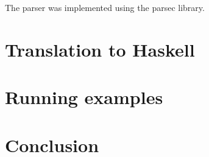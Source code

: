 \documentclass{article}
\def\H{Haskell}
\begin{document}
The parser was implemented using the parsec library.

\section{Translation to \H}
\section{Running examples}
\section{Conclusion}

\hspace{1cm}\\

%
%
%
%

\end{document}
